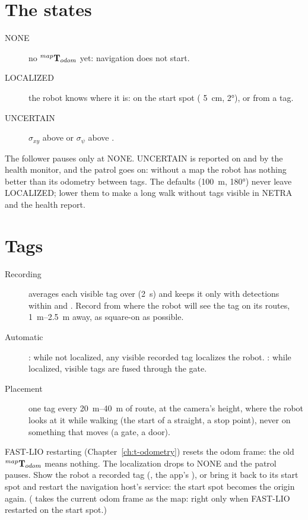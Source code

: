 \section{The states}

\begin{description}
  \item[NONE] no ${}^{map}\mathbf{T}_{odom}$ yet: navigation does not start.
  \item[LOCALIZED] the robot knows where it is: on the start spot (
    \SI{5}{cm},  \ang{2}), or from a tag.
  \item[UNCERTAIN] $\sigma_{xy}$ above  or $\sigma_\psi$ above
    .
\end{description}

The follower pauses only at NONE. UNCERTAIN is reported on  and by
the health monitor, and the patrol goes on: without a map the robot has nothing better than its
odometry between tags. The defaults (\SI{100}{m}, \ang{180}) never leave LOCALIZED; lower them to
make a long walk without tags visible in NETRA and the health report.

\section{Tags}

\begin{description}
  \item[Recording]  averages each visible tag over
     (\SI{2}{s}) and keeps it only with 
    detections within  and . Record from where
    the robot will see the tag on its routes, \SIrange{1}{2.5}{m} away, as square-on as possible.
  \item[Automatic] : while not localized, any visible recorded tag
    localizes the robot. : while localized, visible tags are fused through the
    gate.
  \item[Placement] one tag every \SIrange{20}{40}{m} of route, at the camera's height, where the
    robot looks at it while walking (the start of a straight, a stop point), never on something
    that moves (a gate, a door).
\end{description}

\begin{warnbox}
FAST-LIO restarting (Chapter~\ref{ch:t-odometry}) resets the odom frame: the old
${}^{map}\mathbf{T}_{odom}$ means nothing. The localization drops to NONE and the patrol pauses. Show the
robot a recorded tag (, the app's ), or bring it back to its
start spot and restart the navigation host's service: the start spot becomes the origin again.
( takes the current odom frame as the map: right only when
FAST-LIO restarted on the start spot.)
\end{warnbox}
